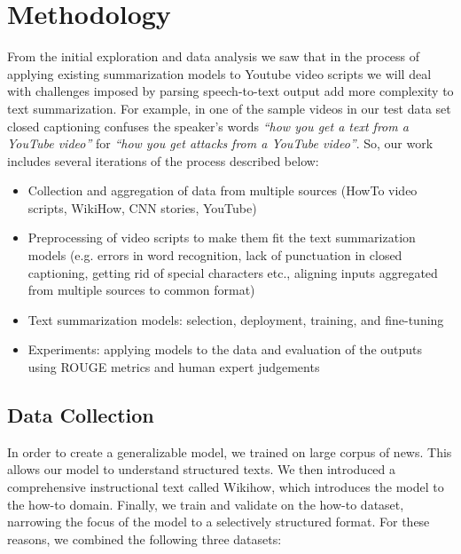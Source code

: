 \documentclass{article}
\begin{document}
\section{Methodology}

From the initial exploration and data analysis we saw that in the process of applying existing summarization models to Youtube video scripts  we will deal with challenges imposed by parsing speech-to-text output add more complexity to text summarization. For example, in one of the sample videos in our test data set closed captioning confuses the speaker’s words \emph{“how you get a text from a YouTube video”} for  \emph{“how you get attacks from a YouTube video”}. So, our work includes several iterations of the process described below:
\begin{itemize}
\item Collection and aggregation of data from multiple sources (HowTo video scripts, WikiHow, CNN stories, YouTube)
\item Preprocessing of video scripts to make them fit the text summarization models (e.g. errors in word recognition, lack of punctuation in closed captioning, getting rid of special characters etc., aligning inputs aggregated from multiple sources  to common format)
\item Text summarization models: selection, deployment, training,  and fine-tuning 
\item Experiments: applying models to the data and evaluation of the outputs using ROUGE metrics and human expert judgements
\end{itemize}
 
\subsection{Data Collection}
In order to create a generalizable model, we trained on large corpus of news. This allows our model to understand structured texts. We then introduced a comprehensive instructional text called Wikihow, which introduces the model to the how-to domain. Finally, we train and validate on the how-to dataset, narrowing the focus of the model to a selectively structured format. 
For these reasons, we combined the following three datasets:
\end{document}
